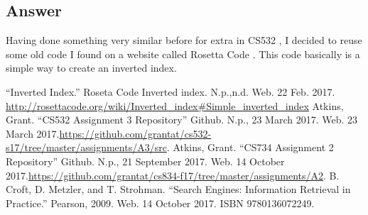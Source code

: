 \documentclass[letterpaper,11pt]{article}
\newcommand*{\srcPath}{../src}%
\begin{document}
\subsection*{Answer}

Having done something very similar before for extra in CS532 \cite{cs532}, I decided to reuse some old code I found on a website called Rosetta Code \cite{invertedindexref}.
This code basically is a simple way to create an inverted index.



\clearpage



\begin{thebibliography}{9}
``Inverted Index.'' Roseta Code Inverted index. N.p.,n.d. Web. 22 Feb. 2017. \url{http://rosettacode.org/wiki/Inverted_index#Simple_inverted_index}
Atkins, Grant. ``CS532 Assignment 3 Repository'' Github. N.p., 23 March 2017. Web. 23 March 2017.\url{https://github.com/grantat/cs532-s17/tree/master/assignments/A3/src}.
Atkins, Grant. ``CS734 Assignment 2 Repository'' Github. N.p., 21 September 2017. Web. 14 October 2017.\url{https://github.com/grantat/cs834-f17/tree/master/assignments/A2}.
B. Croft, D. Metzler, and T. Strohman. ``Search Engines: Information Retrieval in Practice.'' Pearson, 2009. Web. 14 October 2017. ISBN 9780136072249.
\end{thebibliography}
\end{document}
